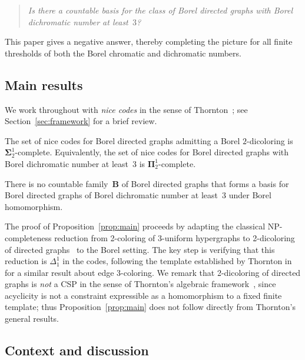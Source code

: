 \documentclass[12pt]{article}
\begin{document}
\begin{quote}
\emph{Is there a countable basis for the class of Borel directed graphs with Borel dichromatic number at least~$3$?}
\end{quote}

This paper gives a negative answer, thereby completing the picture for all finite thresholds of both the Borel chromatic and dichromatic numbers.

\subsection{Main results}

We work throughout with \emph{nice codes} in the sense of Thornton~\cite{thornton2022algebraic, thornton-thesis}; see Section~\ref{sec:framework} for a brief review.

\begin{proposition}\label{prop:main}
	The set of nice codes for Borel directed graphs admitting a Borel $2$-dicoloring is $\mathbf\Sigma^1_2$-complete.
	Equivalently, the set of nice codes for Borel directed graphs with Borel dichromatic number at least~$3$ is $\mathbf\Pi^1_2$-complete.
\end{proposition}

\begin{corollary}\label{cor:no-basis}
	There is no countable family~$\mathbf{B}$ of Borel directed graphs that forms a basis for Borel directed graphs of Borel dichromatic number at least~$3$ under Borel homomorphism.
\end{corollary}

The proof of Proposition~\ref{prop:main} proceeds by adapting the classical NP-completeness reduction from 2-coloring of 3-uniform hypergraphs to 2-dicoloring of directed graphs~\cite{Bokal_2004_CircularChrom} to the Borel setting.
The key step is verifying that this reduction is $\Delta^1_1$ in the codes, following the template established by Thornton in~\cite[Appendix~A]{thornton-thesis} for a similar result about edge 3-coloring.
We remark that 2-dicoloring of directed graphs is \emph{not} a CSP in the sense of Thornton's algebraic framework~\cite{thornton2022algebraic}, since acyclicity is not a constraint expressible as a homomorphism to a fixed finite template; thus Proposition~\ref{prop:main} does not follow directly from Thornton's general results.

\subsection{Context and discussion}
 
\end{document}
